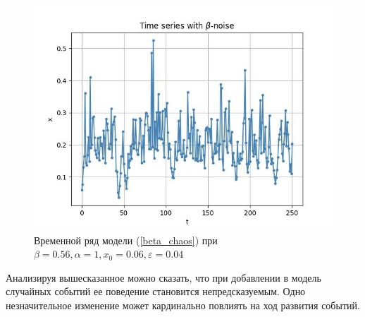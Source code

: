     \begin{figure}
        \centering
        \includegraphics[width=\textwidth]{stochastic/images/time_series_x_0_06_a_1_b_0_56_beta_chaos_epsilon_0_04_alive.jpg}
        
        \captionsetup{justification=centering}
        \caption{Временной ряд модели (\ref{beta_chaos}) при \(\beta = 0.56, \alpha = 1, x_0 = 0.06, \varepsilon = 0.04\)}
        \label{time_series_x_0_06_a_1_b_0_56_beta_chaos_epsilon_0_04_alive}
    \end{figure}

    Анализируя вышесказанное можно сказать, что при добавлении в модель случайных событий ее поведение становится непредсказуемым. Одно незначительное изменение может кардинально повлиять на ход развития событий. 

